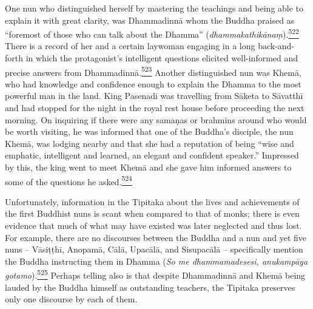 One nun who distinguished herself by mastering the teachings and being
able to explain it with great clarity, was Dhammadinnā whom the Buddha
praised as ``foremost of those who can talk about the Dhamma''
(\emph{dhammakathikānaṃ}).\label{footprints_split_014.html_fnref522}\hyperref[footprints_split_025.htmlux5cux23fn522]{\textsuperscript{522}}
There is a record of her and a certain laywoman engaging in a long
back-and-forth in which the protagonist's intelligent questions elicited
well-informed and precise answers from
Dhammadinnā.\label{footprints_split_014.html_fnref523}\hyperref[footprints_split_025.htmlux5cux23fn523]{\textsuperscript{523}}
Another distinguished nun was Khemā, who had knowledge and confidence
enough to explain the Dhamma to the most powerful man in the land. King
Pasenadi was travelling from Sāketa to Sāvatthī and had stopped for the
night in the royal rest house before proceeding the next morning. On
inquiring if there were any samaṇas or brahmins around who would be
worth visiting, he was informed that one of the Buddha's disciple, the
nun Khemā, was lodging nearby and that she had a reputation of being
``wise and emphatic, intelligent and learned, an elegant and confident
speaker.'' Impressed by this, the king went to meet Khemā and she gave
him informed answers to some of the questions he
asked.\label{footprints_split_014.html_fnref524}\hyperref[footprints_split_025.htmlux5cux23fn524]{\textsuperscript{524}}

Unfortunately, information in the Tipitaka about the lives and
achievements of the first Buddhist nuns is scant when compared to that
of monks; there is even evidence that much of what may have existed was
later neglected and thus lost. For example, there are no discourses
between the Buddha and a nun and yet five nuns -- Vāsiṭṭhī, Anopamā,
Cālā, Upacālā, and Sisupacālā -- specifically mention the Buddha
instructing them in Dhamma (\emph{So me dhammamadesesi, anukampāya
gotamo}).\label{footprints_split_014.html_fnref525}\hyperref[footprints_split_025.htmlux5cux23fn525]{\textsuperscript{525}}
Perhaps telling also is that despite Dhammadinnā and Khemā being lauded
by the Buddha himself as outstanding teachers, the Tipitaka preserves
only one discourse by each of them.

